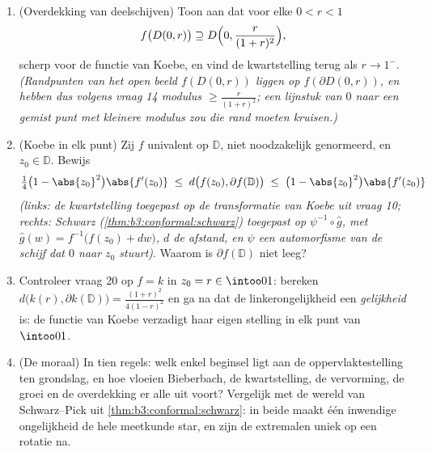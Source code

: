 \begin{problem}
\begin{enumerate}[resume]
        factor $\eu n$ is de prijs van elementair gereedschap.)
  \item (Overdekking van deelschijven) Toon aan dat voor elke $0
        < r < 1$
        \[
        f\bigl(D(0, r)\bigr) \supseteq
        D\Bigl(0, \frac{r}{(1 + r)^2}\Bigr),
        \]
        scherp voor de functie van Koebe, en vind de
        kwartstelling terug als $r \to 1^-$. \emph{(Randpunten van
        het open beeld $f(D(0,r))$ liggen op $f(\partial
        D(0,r))$, en hebben dus volgens vraag 14 modulus $\geq
        \frac{r}{(1+r)^2}$; een lijnstuk van $0$ naar een gemist
        punt met kleinere modulus zou die rand moeten kruisen.)}
  \item (Koebe in elk punt) Zij $f$ univalent op $\mathbb D$,
        niet noodzakelijk genormeerd, en $z_0 \in \mathbb D$.
        Bewijs
        \[
        \tfrac14\bigl(1 - \abs{z_0}^2\bigr)\abs{f'(z_0)}
        \;\leq\;
        d\bigl(f(z_0), \partial f(\mathbb D)\bigr)
        \;\leq\;
        \bigl(1 - \abs{z_0}^2\bigr)\abs{f'(z_0)}
        \]
        \emph{(links: de kwartstelling toegepast op de
        transformatie van Koebe uit vraag 10; rechts: Schwarz
        (\cref{thm:b3:conformal:schwarz}) toegepast op
        $\psi^{-1}\circ\hat g$, met $\hat g(w) = f^{-1}\bigl(f(z_0)
        + dw\bigr)$, $d$ de afstand, en $\psi$ een automorfisme
        van de schijf dat $0$ naar $z_0$ stuurt)}. Waarom is
        $\partial f(\mathbb D)$ niet leeg?
  \item Controleer vraag 20 op $f = k$ in $z_0 = r \in
        \intoo01$: bereken $d\bigl(k(r), \partial k(\mathbb
        D)\bigr) = \frac{(1+r)^2}{4(1-r)^2}$ en ga na dat de
        linkerongelijkheid een \emph{gelijkheid} is: de functie
        van Koebe verzadigt haar eigen stelling in elk punt van
        $\intoo01$.
  \item (De moraal) In tien regels: welk enkel beginsel ligt aan
        de oppervlaktestelling ten grondslag, en hoe vloeien
        Bieberbach, de kwartstelling, de vervorming, de groei en
        de overdekking er alle uit voort? Vergelijk met de wereld
        van Schwarz--Pick uit \cref{thm:b3:conformal:schwarz}: in
        beide maakt één inwendige ongelijkheid de hele meetkunde
        star, en zijn de extremalen uniek op een rotatie na.


\end{enumerate}
\end{problem}
